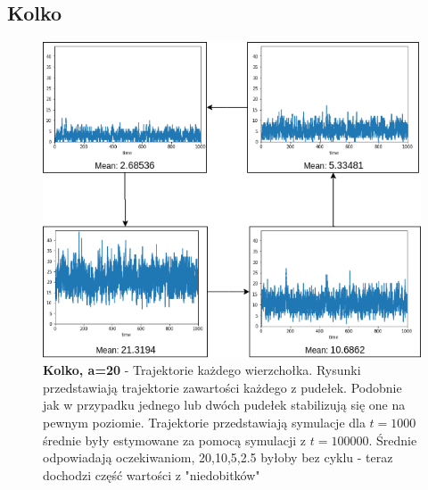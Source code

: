 \documentclass{article}
\begin{document}
\subsection{Kolko}
\begin{figure}[h!]
\centering
\includegraphics[width=1\linewidth]{kolko20/kolko20}
\caption{\textbf{Kolko, a=20} - Trajektorie każdego wierzchołka. \newline
Rysunki przedstawiają trajektorie zawartości każdego z pudełek. Podobnie jak w przypadku jednego lub dwóch pudełek stabilizują się one na pewnym poziomie. Trajektorie przedstawiają symulacje dla $t=1000$ średnie były estymowane za pomocą symulacji z $t=100 000$. Średnie odpowiadają oczekiwaniom, 20,10,5,2.5 byłoby bez cyklu - teraz dochodzi część wartości z "niedobitków"   }
\end{figure}
\end{document}
